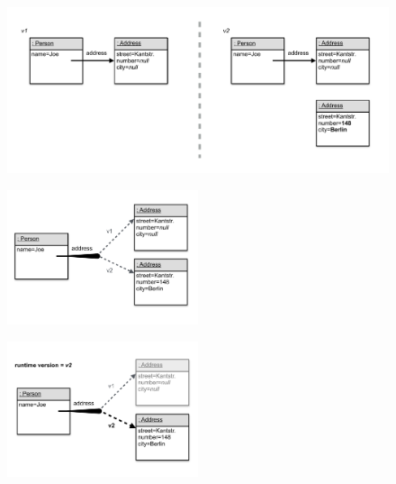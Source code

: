 \begin{figure}[h]
    \centering
    \includegraphics[width=\textwidth]{figures/4_approach/4_referenceToPreviousVersion.pdf}
    \caption{}
    \label{fig:ReferenceFixedToPreviousVersion}
\end{figure}

\begin{figure}[h]
    \centering
    \includegraphics[width=0.5\textwidth]{figures/4_approach/5_versionAwareReference.pdf}
    \caption{}
    \label{fig:VersionAwareReference}
\end{figure}

\begin{figure}[h]
    \centering
    \includegraphics[width=0.5\textwidth]{figures/4_approach/6_versionAwareReferenceFollowingVersion2.pdf}
    \caption{}
    \label{fig:VersionAwareReferenceFollowingVersion2}
\end{figure}

